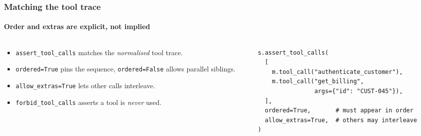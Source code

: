\documentclass[
	aspectratio=169, %
	t,               %
	onlytextwidth,
	10pt,
]{beamer}
\begin{document}
\begin{frame}[fragile]
	\frametitle{Matching the tool trace}
	\framesubtitle{Order and extras are explicit, not implied}
	\begin{columns}[T,onlytextwidth]
		\begin{column}{0.37\linewidth}
			\begin{itemize}
				\setlength\itemsep{0.9em}
				\item \texttt{assert\_tool\_calls} matches the \emph{normalised} tool trace.
				\item \texttt{ordered=True} pins the sequence, \texttt{ordered=False} allows parallel siblings.
				\item \texttt{allow\_extras=True} lets other calls interleave.
				\item \texttt{forbid\_tool\_calls} asserts a tool is \emph{never} used.
			\end{itemize}
		\end{column}
		\hfill
		\begin{column}{0.55\linewidth}
\begin{lstlisting}
s.assert_tool_calls(
  [
    m.tool_call("authenticate_customer"),
    m.tool_call("get_billing",
                args={"id": "CUST-045"}),
  ],
  ordered=True,       # must appear in order
  allow_extras=True,  # others may interleave
)
\end{lstlisting}
		\end{column}
	\end{columns}
\end{frame}
\end{document}
